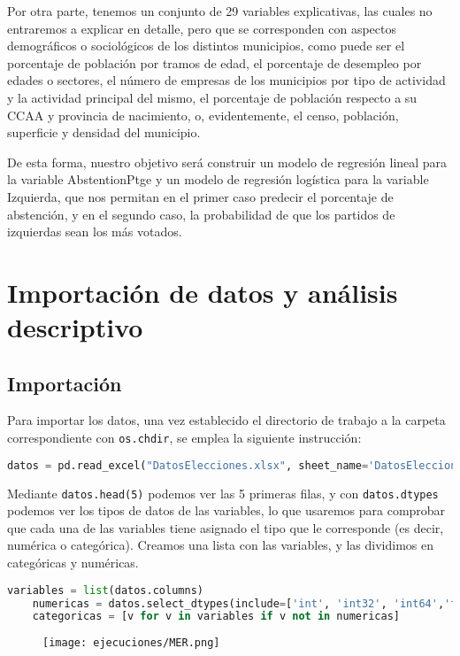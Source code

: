 \documentclass[a4paper,onecolumn]{article}
\begin{document}
\begin{sloppypar}
Por otra parte, tenemos un conjunto de 29 variables explicativas, las cuales no entraremos a explicar en detalle, pero que se corresponden con aspectos 
demográficos o sociológicos de los distintos municipios, como puede ser el porcentaje de población por tramos de edad, el porcentaje de desempleo por edades 
o sectores, el número de empresas de los municipios por tipo de actividad y la actividad principal del mismo, el porcentaje de población respecto a su CCAA 
y provincia de nacimiento, o, evidentemente, el censo, población, superficie y densidad del municipio.

De esta forma, nuestro objetivo será construir un modelo de regresión lineal para la variable AbstentionPtge y un modelo de regresión logística para la 
variable Izquierda, que nos permitan en el primer caso predecir el porcentaje de abstención, y en el segundo caso, la probabilidad de que los partidos de 
izquierdas sean los más votados.

\section{Importación de datos y análisis descriptivo}
\subsection{Importación}
Para importar los datos, una vez establecido el directorio de trabajo a la carpeta correspondiente con \texttt{os.chdir}, se emplea la siguiente instrucción:
\begin{lstlisting}[language=Python, numbers=none]
    datos = pd.read_excel("DatosElecciones.xlsx", sheet_name='DatosEleccionesEspaña')
\end{lstlisting}

Mediante \texttt{datos.head(5)} podemos ver las 5 primeras filas, y con \texttt{datos.dtypes} podemos ver los tipos de datos de las variables, lo que 
usaremos para comprobar que cada una de las variables tiene asignado el tipo que le corresponde (es decir, numérica o categórica). Creamos una lista con 
las variables, y las dividimos en categóricas y numéricas.
\begin{lstlisting}[language=Python]
    variables = list(datos.columns)
    numericas = datos.select_dtypes(include=['int', 'int32', 'int64','float', 'float32', 'float64']).columns
    categoricas = [v for v in variables if v not in numericas]
\end{lstlisting}
\begin{center}
    \begin{figure}[h!]
        \texttt{[image: ejecuciones/MER.png]}
    \end{figure}
\end{center}


\end{sloppypar}
\end{document}
